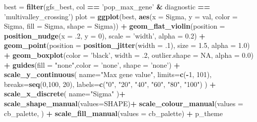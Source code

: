 \documentclass[]{book}
\newenvironment{Shaded}{\begin{snugshade}}{\end{snugshade}}
\newcommand{\DataTypeTok}[1]{\textcolor[rgb]{0.13,0.29,0.53}{#1}}
\newcommand{\DecValTok}[1]{\textcolor[rgb]{0.00,0.00,0.81}{#1}}
\newcommand{\FloatTok}[1]{\textcolor[rgb]{0.00,0.00,0.81}{#1}}
\newcommand{\KeywordTok}[1]{\textcolor[rgb]{0.13,0.29,0.53}{\textbf{#1}}}
\newcommand{\NormalTok}[1]{#1}
\newcommand{\OperatorTok}[1]{\textcolor[rgb]{0.81,0.36,0.00}{\textbf{#1}}}
\newcommand{\OtherTok}[1]{\textcolor[rgb]{0.56,0.35,0.01}{#1}}
\newcommand{\StringTok}[1]{\textcolor[rgb]{0.31,0.60,0.02}{#1}}
\begin{document}
\begin{Shaded}
\begin{Highlighting}[]
\NormalTok{best =}\StringTok{ }\KeywordTok{filter}\NormalTok{(gfs_best, col }\OperatorTok{==}\StringTok{ 'pop_max_gene'} \OperatorTok{&}\StringTok{ }\NormalTok{diagnostic }\OperatorTok{==}\StringTok{ 'multivalley_crossing'}\NormalTok{)}
\NormalTok{plot =}\StringTok{  }\KeywordTok{ggplot}\NormalTok{(best, }\KeywordTok{aes}\NormalTok{(}\DataTypeTok{x =}\NormalTok{ Sigma, }\DataTypeTok{y =}\NormalTok{ val, }\DataTypeTok{color =}\NormalTok{ Sigma, }\DataTypeTok{fill =}\NormalTok{ Sigma, }\DataTypeTok{shape =}\NormalTok{ Sigma)) }\OperatorTok{+}
\StringTok{          }\KeywordTok{geom_flat_violin}\NormalTok{(}\DataTypeTok{position =} \KeywordTok{position_nudge}\NormalTok{(}\DataTypeTok{x =} \FloatTok{.2}\NormalTok{, }\DataTypeTok{y =} \DecValTok{0}\NormalTok{), }\DataTypeTok{scale =} \StringTok{'width'}\NormalTok{, }\DataTypeTok{alpha =} \FloatTok{0.2}\NormalTok{) }\OperatorTok{+}
\StringTok{          }\KeywordTok{geom_point}\NormalTok{(}\DataTypeTok{position =} \KeywordTok{position_jitter}\NormalTok{(}\DataTypeTok{width =} \FloatTok{.1}\NormalTok{), }\DataTypeTok{size =} \FloatTok{1.5}\NormalTok{, }\DataTypeTok{alpha =} \FloatTok{1.0}\NormalTok{) }\OperatorTok{+}
\StringTok{          }\KeywordTok{geom_boxplot}\NormalTok{(}\DataTypeTok{color =} \StringTok{'black'}\NormalTok{, }\DataTypeTok{width =} \FloatTok{.2}\NormalTok{, }\DataTypeTok{outlier.shape =} \OtherTok{NA}\NormalTok{, }\DataTypeTok{alpha =} \FloatTok{0.0}\NormalTok{) }\OperatorTok{+}
\StringTok{          }\KeywordTok{guides}\NormalTok{(}\DataTypeTok{fill =} \StringTok{"none"}\NormalTok{,}\DataTypeTok{color =} \StringTok{'none'}\NormalTok{, }\DataTypeTok{shape =} \StringTok{'none'}\NormalTok{) }\OperatorTok{+}
\StringTok{          }\KeywordTok{scale_y_continuous}\NormalTok{(}
          \DataTypeTok{name=}\StringTok{"Max gene value"}\NormalTok{,}
          \DataTypeTok{limits=}\KeywordTok{c}\NormalTok{(}\OperatorTok{-}\DecValTok{1}\NormalTok{, }\DecValTok{101}\NormalTok{),}
          \DataTypeTok{breaks=}\KeywordTok{seq}\NormalTok{(}\DecValTok{0}\NormalTok{,}\DecValTok{100}\NormalTok{, }\DecValTok{20}\NormalTok{),}
          \DataTypeTok{labels=}\KeywordTok{c}\NormalTok{(}\StringTok{"0"}\NormalTok{, }\StringTok{"20"}\NormalTok{, }\StringTok{"40"}\NormalTok{, }\StringTok{"60"}\NormalTok{, }\StringTok{"80"}\NormalTok{, }\StringTok{"100"}\NormalTok{)}
\NormalTok{          ) }\OperatorTok{+}
\StringTok{          }\KeywordTok{scale_x_discrete}\NormalTok{(}
            \DataTypeTok{name=}\StringTok{"Sigma"}
\NormalTok{          )}\OperatorTok{+}
\StringTok{          }\KeywordTok{scale_shape_manual}\NormalTok{(}\DataTypeTok{values=}\NormalTok{SHAPE)}\OperatorTok{+}
\StringTok{          }\KeywordTok{scale_colour_manual}\NormalTok{(}\DataTypeTok{values =}\NormalTok{ cb_palette, ) }\OperatorTok{+}
\StringTok{          }\KeywordTok{scale_fill_manual}\NormalTok{(}\DataTypeTok{values =}\NormalTok{ cb_palette) }\OperatorTok{+}
\StringTok{          }\NormalTok{p_theme}


\end{Highlighting}
\end{Shaded}
\end{document}
